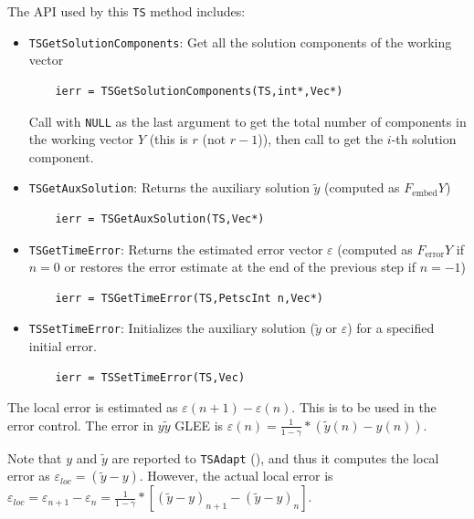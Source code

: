 The API used by this \lstinline{TS} method includes:
\begin{itemize}
  \item \lstinline{TSGetSolutionComponents}: Get all the solution components of the working vector
    \begin{lstlisting}
    ierr = TSGetSolutionComponents(TS,int*,Vec*)
    \end{lstlisting}
    Call with \lstinline{NULL} as the last argument to get the total number of
    components in the working vector $Y$ (this is $r$ (not $r-1$)),
    then call to get the $i$-th solution component.
  \item \lstinline{TSGetAuxSolution}: Returns the auxiliary solution $\tilde{y}$ (computed as $F_\text{embed} Y$)
    \begin{lstlisting}
    ierr = TSGetAuxSolution(TS,Vec*)
    \end{lstlisting}
  \item \lstinline{TSGetTimeError}: Returns the estimated error vector $\varepsilon$
(computed as $F_\text{error} Y$ if $n=0$ or restores the error estimate at
    the end of the previous step if $n=-1$)
    \begin{lstlisting}
    ierr = TSGetTimeError(TS,PetscInt n,Vec*)
    \end{lstlisting}
  \item \lstinline{TSSetTimeError}: Initializes the auxiliary solution ($\tilde{y}$
or $\varepsilon$) for a specified initial error.
    \begin{lstlisting}
    ierr = TSSetTimeError(TS,Vec)
    \end{lstlisting}
\end{itemize}

The local error is estimated as $\varepsilon(n+1)-\varepsilon(n)$.
This is to be used in the error control. The error in $y\tilde{y}$
GLEE is $\varepsilon(n) = \frac{1}{1-\gamma} * (\tilde{y}(n) - y(n))$.

Note that $y$ and $\tilde{y}$ are reported to \lstinline{TSAdapt}  (), and thus it
computes the local error as $\varepsilon_{loc} = (\tilde{y} -
y)$. However, the actual local error is  $\varepsilon_{loc}
= \varepsilon_{n+1} - \varepsilon_n = \frac{1}{1-\gamma} * [(\tilde{y} -
y)_{n+1} - (\tilde{y} - y)_n]$.

